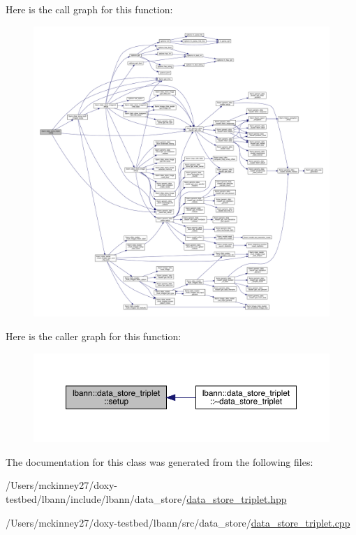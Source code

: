 Here is the call graph for this function\+:\nopagebreak
\begin{figure}[H]
\begin{center}
\leavevmode
\includegraphics[width=350pt]{classlbann_1_1data__store__triplet_aca66b9cf71d7ba2b9870e76c5b92b5e8_cgraph}
\end{center}
\end{figure}
Here is the caller graph for this function\+:\nopagebreak
\begin{figure}[H]
\begin{center}
\leavevmode
\includegraphics[width=350pt]{classlbann_1_1data__store__triplet_aca66b9cf71d7ba2b9870e76c5b92b5e8_icgraph}
\end{center}
\end{figure}


The documentation for this class was generated from the following files\+:\begin{DoxyCompactItemize}
\item 
/\+Users/mckinney27/doxy-\/testbed/lbann/include/lbann/data\+\_\+store/\hyperlink{data__store__triplet_8hpp}{data\+\_\+store\+\_\+triplet.\+hpp}\item 
/\+Users/mckinney27/doxy-\/testbed/lbann/src/data\+\_\+store/\hyperlink{data__store__triplet_8cpp}{data\+\_\+store\+\_\+triplet.\+cpp}\end{DoxyCompactItemize}
